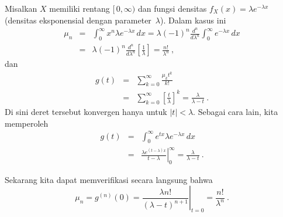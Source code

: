 \begin{example}\label{exam 10.3.2}
Misalkan $X$ memiliki rentang $[\,0,\infty)$ dan fungsi densitas $f_X(x) = \lambda
e^{-\lambda x}$ (densitas eksponensial dengan parameter~$\lambda$).  Dalam kasus ini
\begin{eqnarray*}
\mu_n &=& \int_0^\infty x^n \lambda e^{-\lambda x}\, dx = \lambda(-1)^n
\frac{d^n}{d\lambda^n} \int_0^\infty e^{-\lambda x}\, dx \\
      &=& \lambda(-1)^n \frac{d^n}{d\lambda^n} [\frac1\lambda] = \frac{n!}
{\lambda^n}\ ,
\end{eqnarray*}
dan
\begin{eqnarray*}
g(t) &=& \sum_{k = 0}^\infty \frac{\mu_k t^k}{k!} \\
     &=& \sum_{k = 0}^\infty [\frac t\lambda]^k = \frac\lambda{\lambda - t}\ .
\end{eqnarray*}
Di sini deret tersebut konvergen hanya untuk $|t| < \lambda$.  Sebagai cara lain, kita memperoleh
\begin{eqnarray*}
g(t) &=& \int_0^\infty e^{tx} \lambda e^{-\lambda x}\, dx \\
     &=& \left.\frac{\lambda e^{(t - \lambda)x}}{t - \lambda}\right|_0^\infty =
\frac\lambda{\lambda - t}\ .
\end{eqnarray*}

Sekarang kita dapat memverifikasi secara langsung bahwa
$$
\mu_n = g^{(n)}(0) = \left.\frac{\lambda n!}{(\lambda - t)^{n + 1}}\right|_{t =
0} = \frac{n!}{\lambda^n}\ .
$$
\end{example}

